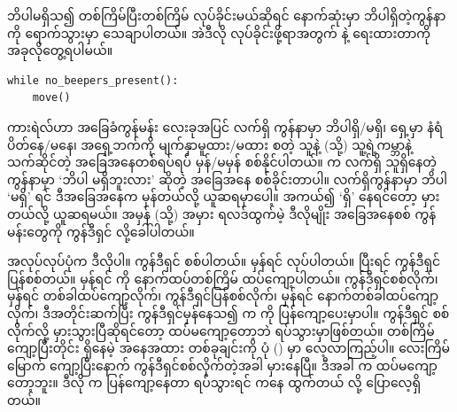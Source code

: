 ဘိပါမရှိသ၍ တစ်ကြိမ်ပြီးတစ်ကြိမ်  လုပ်ခိုင်းမယ်ဆိုရင် နောက်ဆုံးမှာ ဘိပါရှိတဲ့ကွန်နာကို ရောက်သွားမှာ သေချာပါတယ်။ အဲဒီလို လုပ်ခိုင်းဖို့ရာအတွက်   နဲ့ ရေးထားတာကို အခုလိုတွေ့ရပါမယ်။
%
\setlength{\fboxsep}{0pt}
\begin{verbatim}
while no_beepers_present():
    move()
\end{verbatim}
%

ကားရဲလ်ဟာ အခြေခံကွန်မန်း လေးခုအပြင် လက်ရှိ ကွန်နာမှာ ဘိပါရှိ/မရှိ၊ ရှေ့မှာ နံရံပိတ်နေ/မနေ၊ အရှေ့ဘက်ကို မျက်နှာမူထား/မထား စတဲ့ သူနဲ့ (သို့) သူ့ရဲ့ကမ္ဘာနဲ့ သက်ဆိုင်တဲ့ အခြေအနေတစ်ရပ်ရပ် မှန်/မမှန် စစ်နိုင်ပါတယ်။  က လက်ရှိ သူရှိနေတဲ့ ကွန်နာမှာ ‘ဘိပါ မရှိဘူးလား’ ဆိုတဲ့ အခြေအနေ စစ်ခိုင်းတာပါ။ လက်ရှိကွန်နာမှာ ဘိပါ ‘မရှိ’ ရင် ဒီအခြေအနေက မှန်တယ်လို့ ယူဆရမှာပေါ့။ အကယ်၍ ‘ရှိ’ နေရင်တော့ မှားတယ်လို့ ယူဆရမယ်။ အမှန် (သို့) အမှား ရလဒ်ထွက်မဲ့ ဒီလိုမျိုး အခြေအနေစစ် ကွန်မန်းတွေကို  ကွန်ဒီရှင်  လို့ခေါ်ပါတယ်။

  အလုပ်လုပ်ပုံက ဒီလိုပါ။  ကွန်ဒီရှင် စစ်ပါတယ်။ မှန်ရင်   လုပ်ပါတယ်။ ပြီးရင် ကွန်ဒီရှင်ပြန်စစ်တယ်။ မှန်ရင်  ကို နောက်ထပ်တစ်ကြိမ် ထပ်ကျော့ပါတယ်။ ကွန်ဒီရှင်စစ်လိုက်၊ မှန်ရင် တစ်ခါထပ်ကျော့လိုက်၊ ကွန်ဒီရှင်ပြန်စစ်လိုက်၊ မှန်ရင် နောက်တစ်ခါထပ်ကျော့လိုက်၊  ဒီအတိုင်းဆက်ပြီး ကွန်ဒီရှင်မှန်နေသ၍   က  ကို ပြန်ကျော့ပေးမှာပါ။ ကွန်ဒီရှင် စစ်လိုက်လို့ မှားသွားပြီဆိုရင်တော့ ထပ်မကျော့တော့ဘဲ ရပ်သွားမှာဖြစ်တယ်။    တစ်ကြိမ်ကျော့ပြီးတိုင်း ရှိနေမဲ့ အနေအထား တစ်ခုချင်းကို ပုံ (\fRefNo{\ref{fig:gpb_iters}})  မှာ  လေ့လာကြည့်ပါ။ လေးကြိမ်မြောက် ကျော့ပြီးနောက်  ကွန်ဒီရှင်စစ်လိုက်တဲ့အခါ မှားနေပြီ။ ဒီအခါ    က ထပ်မကျော့တော့ဘူး။ ဒီလို  က ပြန်ကျော့နေတာ ရပ်သွားရင်  ကနေ ထွက်တယ်  လို့ ပြောလေ့ရှိတယ်။ 

